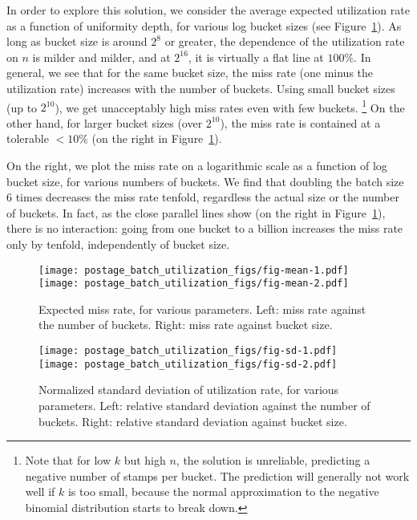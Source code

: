 In order to explore this solution, we consider the average expected
utilization rate as a function of uniformity depth, for various log bucket
sizes (see Figure~\ref{fig-mean}). As long as bucket size is around $2^8$ or greater,
the dependence of the utilization rate on $n$ is milder and milder, and at $2^{16}$, it is virtually a flat line at $100\%$.
In general, we see that for the same bucket size, the miss rate
(one minus the utilization rate) increases with the number of buckets. Using
small bucket sizes (up to $2^{10}$), we get unacceptably high miss
rates even with few buckets.%
%
\footnote{Note that for low $k$ but high
  $n$, the solution is unreliable, predicting a negative number of
  stamps per bucket. The prediction will generally not work well if
  $k$ is too small, because the normal approximation to the negative
  binomial distribution starts to break down.}
%  
On the other hand, for
larger bucket sizes (over $2^{10}$), the miss rate is contained at a
tolerable $<10\%$ (on the right in Figure~\ref{fig-mean}).

On the right, we plot the miss rate on a logarithmic scale as a function of log bucket size, for various numbers of buckets. We
find that doubling the batch size 6 times decreases the miss rate
tenfold, regardless the actual size or the number of buckets. In fact,
as the close parallel lines show (on the right in Figure~\ref{fig-mean}), there is no interaction:
going from one bucket to a billion increases the miss rate
only by tenfold, independently of bucket size.


\begin{figure}[!ht]
  \centering
  \texttt{[image: postage\_batch\_utilization\_figs/fig-mean-1.pdf]} \texttt{[image: postage\_batch\_utilization\_figs/fig-mean-2.pdf]}
  \caption[Expected miss rate, for various parameters.]{\label{fig-mean}Expected miss rate, for various parameters. Left: miss rate against the number of buckets. Right: miss rate against bucket size.}
\end{figure}


\begin{figure}[!ht]
  \centering
  \texttt{[image: postage\_batch\_utilization\_figs/fig-sd-1.pdf]} \texttt{[image: postage\_batch\_utilization\_figs/fig-sd-2.pdf]}
  \caption[Normalized standard deviation of utilization rate]{\label{fig-sd}Normalized standard deviation of utilization rate, for various parameters. Left: relative standard deviation against the number of buckets. Right: relative standard deviation against bucket size.}
\end{figure}




